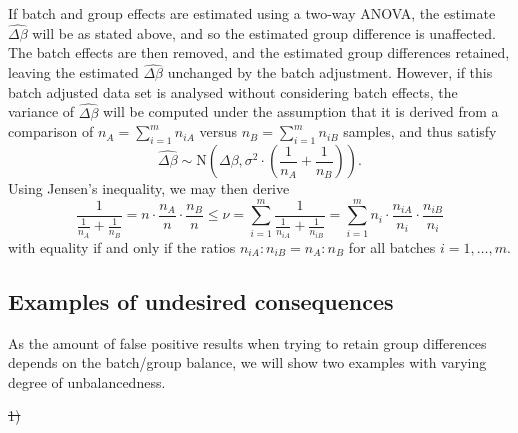 \documentclass{bio}
\providecommand{\DIFaddtex}[1]{{\protect\color{blue}\uwave{#1}}} %
\providecommand{\DIFdeltex}[1]{{\protect\color{red}\sout{#1}}}                      %
\providecommand{\DIFaddbegin}{} %
\providecommand{\DIFdelbegin}{} %
\providecommand{\DIFdelend}{} %
\providecommand{\DIFadd}[1]{\texorpdfstring{\DIFaddtex{#1}}{#1}} %
\providecommand{\DIFdel}[1]{\texorpdfstring{\DIFdeltex{#1}}{}} %
\begin{document}
If batch and group effects are estimated using a two-way ANOVA, the estimate $\widehat{\Delta\beta}$ will be as stated above, and so the estimated group difference is unaffected. The batch effects are then removed, and the estimated group differences retained, leaving the estimated $\widehat{\Delta\beta}$ unchanged by the batch adjustment. However, if this batch adjusted data set is analysed without considering batch effects, the variance of $\widehat{\Delta\beta}$ will be computed under the assumption that it is derived from a comparison of $n_A=\sum_{i=1}^m n_{iA}$ versus $n_B=\sum_{i=1}^m n_{iB}$ samples, and thus satisfy
\begin{equation}
\widehat{\Delta\beta}
\sim\text{N}\left(\Delta\beta,\sigma^2\cdot\left(\frac{1}{n_A}+\frac{1}{n_B}\right)\right).
\end{equation}
Using Jensen's inequality, we may then derive
\begin{equation}
\frac{1}{\frac{1}{n_A}+\frac{1}{n_B}}=n\cdot\frac{n_A}{n}\cdot\frac{n_B}{n}
\le
\nu
=\sum_{i=1}^m \frac{1}{\frac{1}{n_{iA}}+\frac{1}{n_{iB}}}
=\sum_{i=1}^m n_i\cdot\frac{n_{iA}}{n_i}\cdot\frac{n_{iB}}{n_i}
\end{equation}
with equality if and only if the ratios $n_{iA}:n_{iB}=n_A:n_B$ for all batches $i=1,\ldots,m$.



\subsection{Examples of undesired consequences}

As the amount of false positive results when trying to retain group differences depends on the batch/group balance, we will show two examples with varying degree of unbalancedness. 

\DIFdelbegin \DIFdel{1) }\DIFdelend \DIFaddbegin \subsubsection{\DIFadd{Experiment 1}}
\end{document}

